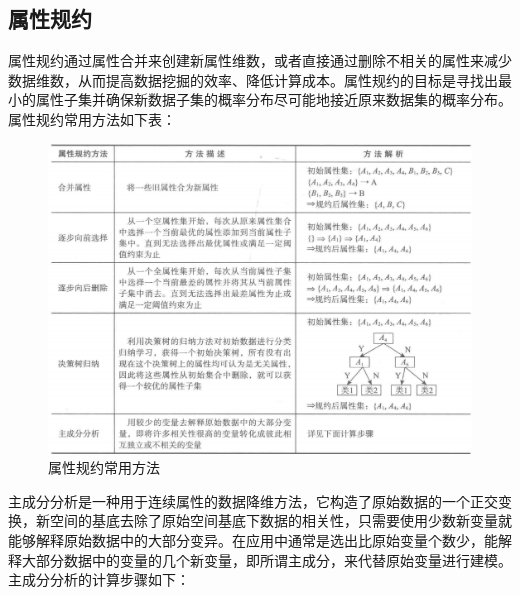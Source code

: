 \documentclass[openany]{progbookcn}
\begin{document}
\subsection{属性规约}
\indent 属性规约通过属性合并来创建新属性维数，或者直接通过删除不相关的属性来减少数据维数，从而提高数据挖掘的效率、降低计算成本。属性规约的目标是寻找出最小的属性子集并确保新数据子集的概率分布尽可能地接近原来数据集的概率分布。属性规约常用方法如下表：
\begin{figure}[H]
\centering
\includegraphics[width=0.8 \textwidth]{figs/chapter23/属性规约常用方法}
\caption{属性规约常用方法}
\end{figure}
\indent 主成分分析是一种用于连续属性的数据降维方法，它构造了原始数据的一个正交变换，新空间的基底去除了原始空间基底下数据的相关性，只需要使用少数新变量就能够解释原始数据中的大部分变异。在应用中通常是选出比原始变量个数少，能解释大部分数据中的变量的几个新变量，即所谓主成分，来代替原始变量进行建模。\\
\indent 主成分分析的计算步骤如下：
\end{document}
